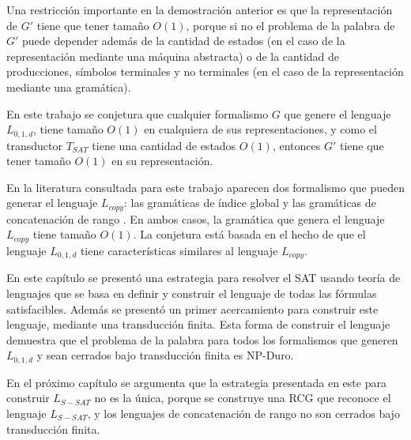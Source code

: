 \documentclass[12pt]{article}
\begin{document}
Una restricción importante en la demostración anterior es que la representación de $G'$ tiene que tener tamaño $O(1)$, porque si no el problema de la palabra de $G'$ puede depender además de la cantidad de estados (en el caso de la representación mediante una máquina abstracta) o de la cantidad de producciones, símbolos terminales y no terminales (en el caso de la representación mediante una gramática).

En este trabajo se conjetura que cualquier formalismo $G$ que genere el lenguaje $L_{0,1,d}$, tiene tamaño $O(1)$ en cualquiera de sus representaciones, y como el transductor $T_{SAT}$ tiene una cantidad de estados $O(1)$, entonces $G'$ tiene que tener tamaño $O(1)$ en su representación.

En la literatura consultada para este trabajo aparecen dos formalismo que pueden generar el lenguaje $L_{copy}$: las gramáticas de índice global \cite{globalIndexLanguages} y las gramáticas de concatenación de rango \cite{propertiesRCGBib}. En ambos casos, la gramática que genera el lenguaje $L_{copy}$ tiene tamaño $O(1)$. La conjetura está basada en el hecho de que el lenguaje $L_{0,1,d}$ tiene características similares al lenguaje $L_{copy}$.

En este capítulo se presentó una estrategia para resolver el SAT usando teoría de lenguajes que se basa en definir y construir el lenguaje de todas las fórmulas satisfacibles. Además se presentó un primer acercamiento para construir este lenguaje, mediante una transducción finita. Esta forma de construir el lenguaje demuestra que el problema de la palabra para todos los formalismos que generen $L_{0,1,d}$ y sean cerrados bajo transducción finita es NP-Duro.

En el próximo capítulo se argumenta que la estrategia presentada en este para construir $L_{S-SAT}$ no es la única, porque se construye una RCG que reconoce el lenguaje $L_{S-SAT}$, y los lenguajes de concatenación de rango no son cerrados bajo transducción finita.
\end{document}
